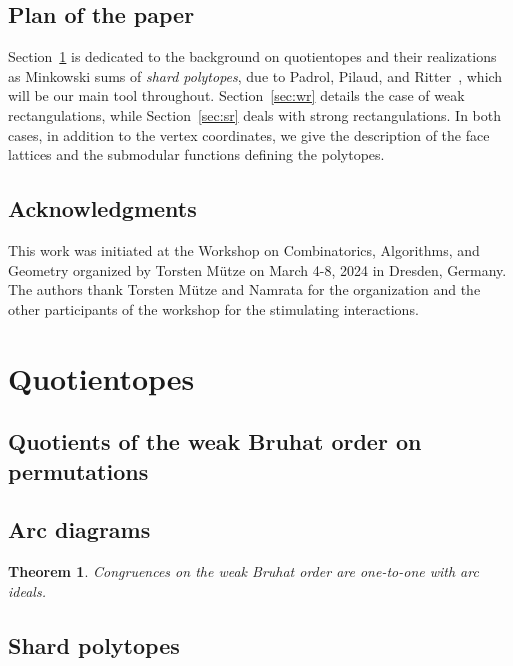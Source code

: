\documentclass{amsart}
\newtheorem{theorem}{Theorem}%
\theoremstyle{definition}
\newcommand{\darkblue}{\color{darkblue}} %
\newcommand{\defn}[1]{\textsl{\darkblue #1}} %
\begin{document}
\subsection{Plan of the paper}

 Section~\ref{sec:quotientopes} is dedicated to the background on quotientopes and their realizations as Minkowski sums of \defn{shard polytopes}, due to Padrol, Pilaud, and Ritter~\cite{MR4584712}, which will be our main tool throughout. Section~\ref{sec:wr} details the case of weak rectangulations, while Section~\ref{sec:sr} deals with strong rectangulations. In both cases, in addition to the vertex coordinates, we give the description of the face lattices and the submodular functions defining the polytopes.

\subsection*{Acknowledgments}

This work was initiated at the Workshop on Combinatorics, Algorithms, and Geometry organized by Torsten M\"utze on March 4-8, 2024 in Dresden, Germany. The authors thank Torsten M\"utze and Namrata for the organization and the other participants of the workshop for the stimulating interactions.


\section{Quotientopes}
\label{sec:quotientopes}

\subsection{Quotients of the weak Bruhat order on permutations}

\subsection{Arc diagrams}

\begin{theorem}
  Congruences on the weak Bruhat order are one-to-one with arc ideals.
\end{theorem}

\subsection{Shard polytopes}
\end{document}
